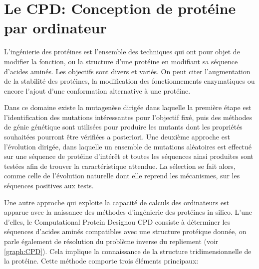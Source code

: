 \chapter{Le \og CPD\fg: Conception de protéine par ordinateur}
\label{chap:CPD}
L'ingénierie des protéines est l'ensemble des techniques qui ont pour objet de modifier la fonction, ou la structure d'une protéine en modifiant sa séquence d'acides aminés. Les objectifs sont divers et variés. On peut citer l'augmentation de la stabilité des protéines, la  modification des fonctionnements enzymatiques ou encore l'ajout d'une conformation alternative à une protéine.

Dans ce domaine existe la mutagenèse dirigée dans laquelle la première étape est l'identification des mutations intéressantes pour l'objectif fixé, puis des méthodes de génie génétique sont utilisées pour produire les mutants dont les propriétés souhaitées pourront être vérifiées a posteriori. Une deuxième approche est l'évolution dirigée, dans laquelle un ensemble de mutations aléatoires est effectué sur une séquence de protéine d'intérêt et toutes les séquences ainsi produites sont testées afin de trouver la caractéristique attendue. La sélection se fait alors, comme celle de l'évolution naturelle dont elle reprend les mécanismes, sur les séquences positives aux tests.

Une autre approche qui exploite la capacité de calculs des ordinateurs est apparue avec la naissance des méthodes d'ingénierie des protéines \og in silico\fg. L'une d'elles, le \og Computational Protein Design\fg ou CPD consiste à déterminer les séquences d'acides aminés compatibles avec une structure protéique donnée, on parle également de résolution du problème inverse du repliement (voir \ref{graph:CPD}). Cela implique la connaissance de la structure tridimensionnelle de la protéine. Cette méthode comporte trois éléments principaux:

